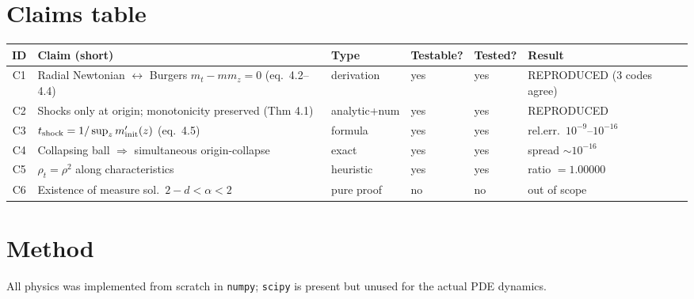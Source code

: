 \documentclass[11pt]{article}
\begin{document}
\section{Claims table}
\begin{center}\small
\begin{tabular}{@{}clllll@{}}
\toprule
ID & Claim (short) & Type & Testable? & Tested? & Result \\ \midrule
C1 & Radial Newtonian $\leftrightarrow$ Burgers $m_t-mm_z=0$ (eq.~4.2--4.4) & derivation & yes & yes & REPRODUCED (3 codes agree) \\
C2 & Shocks only at origin; monotonicity preserved (Thm 4.1) & analytic+num & yes & yes & REPRODUCED \\
C3 & $t_{\rm shock}=1/\sup_z m'_{\rm init}(z)$ (eq.~4.5) & formula & yes & yes & rel.err.\ $10^{-9}$--$10^{-16}$ \\
C4 & Collapsing ball $\Rightarrow$ simultaneous origin-collapse & exact & yes & yes & spread $\sim\!10^{-16}$ \\
C5 & $\rho_t=\rho^2$ along characteristics & heuristic & yes & yes & ratio $=1.00000$ \\
C6 & Existence of measure sol.\ $2\!-\!d\!<\!\alpha\!<\!2$ & pure proof & no & no & out of scope \\
\bottomrule
\end{tabular}
\end{center}

\section{Method}
All physics was implemented from scratch in \texttt{numpy}; \texttt{scipy} is
present but unused for the actual PDE dynamics.
\end{document}
